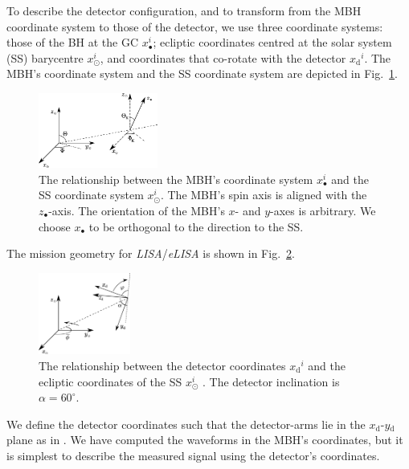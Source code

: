 \documentclass[useAMS,usedcolumn,usegraphicx,usenatbib]{mn2e}
\newcommand{\figref}[1]{Fig.~\ref{fig:#1}}
\newcommand{\sub}[1]{\ensuremath{_\mathrm{#1}}}
\begin{document}
To describe the detector configuration, and to transform from the MBH coordinate system to those of the detector, we use three coordinate systems: those of the BH at the GC $x_\bullet^i$; ecliptic coordinates centred at the solar system (SS) barycentre $x_\odot^i$, and coordinates that co-rotate with the detector $x\sub{d}^i$. The MBH's coordinate system and the SS coordinate system are depicted in \figref{BH_SS}.
\begin{figure}
\begin{center}
 \includegraphics[width=0.35\textwidth]{BH_SS_angles.eps}
    \caption{The relationship between the MBH's coordinate system $x_\bullet^i$ and the SS coordinate system $x_\odot^i$. The MBH's spin axis is aligned with the $z_\bullet$-axis. The orientation of the MBH's $x$- and $y$-axes is arbitrary. We choose $x_\bullet$ to be orthogonal to the direction to the SS.}
   \label{fig:BH_SS}
\end{center}
\end{figure}
The mission geometry for \textit{LISA}/\textit{eLISA} is shown in \figref{SS_LISA}.
\begin{figure}
\begin{center}
 \includegraphics[width=0.27\textwidth]{SS_LISA.eps}
    \caption{The relationship between the detector coordinates $x\sub{d}^i$ and the ecliptic coordinates of the SS $x_\odot^i$ \citep{Bender1998, Jennrich2011}. The detector inclination is $\alpha = 60^{\circ}$.}
   \label{fig:SS_LISA}
\end{center}
\end{figure}
We define the detector coordinates such that the detector-arms lie in the $x\sub{d}$-$y\sub{d}$ plane as in \citet{Cutler1998}. We have computed the waveforms in the MBH's coordinates, but it is simplest to describe the measured signal using the detector's coordinates.
\end{document}
